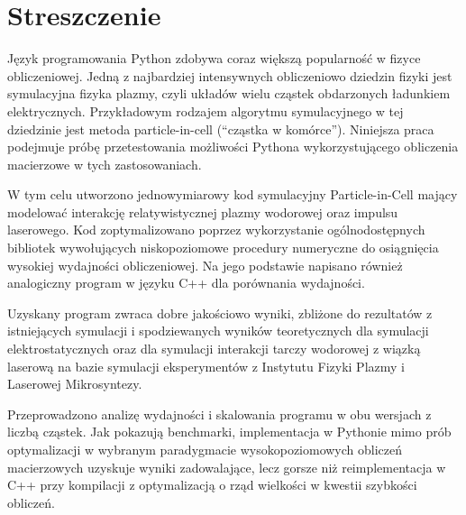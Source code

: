 \section{Streszczenie}

Język programowania Python zdobywa coraz większą popularność w fizyce obliczeniowej.
Jedną z najbardziej intensywnych obliczeniowo dziedzin fizyki jest symulacyjna fizyka
plazmy, czyli układów wielu cząstek obdarzonych ładunkiem elektrycznych.
Przykładowym rodzajem algorytmu symulacyjnego w tej dziedzinie jest metoda particle-in-cell
(``cząstka w komórce'').
Niniejsza praca podejmuje próbę przetestowania możliwości Pythona wykorzystującego 
obliczenia macierzowe w tych zastosowaniach.

W tym celu
utworzono jednowymiarowy kod symulacyjny Particle-in-Cell mający modelować interakcję relatywistycznej plazmy wodorowej oraz
impulsu laserowego. Kod zoptymalizowano poprzez wykorzystanie ogólnodostępnych bibliotek 
wywołujących niskopoziomowe procedury numeryczne do osiągnięcia wysokiej wydajności obliczeniowej. Na jego podstawie
napisano również analogiczny program w języku C++ dla porównania wydajności.

Uzyskany program zwraca dobre jakościowo wyniki, zbliżone do rezultatów z istniejących symulacji i spodziewanych
wyników teoretycznych dla symulacji elektrostatycznych oraz dla symulacji interakcji tarczy wodorowej z wiązką laserową
na bazie symulacji eksperymentów z Instytutu Fizyki Plazmy i Laserowej Mikrosyntezy.

Przeprowadzono analizę wydajności i skalowania programu w obu wersjach z liczbą cząstek.  
Jak pokazują benchmarki, implementacja w Pythonie mimo prób optymalizacji w wybranym paradygmacie wysokopoziomowych obliczeń macierzowych
uzyskuje wyniki zadowalające, lecz gorsze niż reimplementacja w C++ przy
kompilacji z optymalizacją o rząd wielkości w kwestii szybkości obliczeń.
